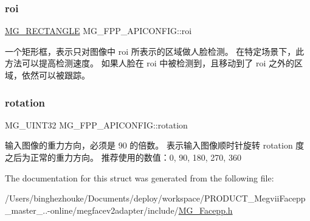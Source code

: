 \subsubsection{\texorpdfstring{roi}{roi}}
{\footnotesize\ttfamily \hyperlink{struct_m_g___r_e_c_t_a_n_g_l_e}{M\+G\+\_\+\+R\+E\+C\+T\+A\+N\+G\+LE} M\+G\+\_\+\+F\+P\+P\+\_\+\+A\+P\+I\+C\+O\+N\+F\+I\+G\+::roi}

一个矩形框，表示只对图像中 roi 所表示的区域做人脸检测。 在特定场景下，此方法可以提高检测速度。 如果人脸在 roi 中被检测到，且移动到了 roi 之外的区域，依然可以被跟踪。 \mbox{\label{struct_m_g___f_p_p___a_p_i_c_o_n_f_i_g_ad0896de3b631a7d8cf84fbfc8015d533}} 
\subsubsection{\texorpdfstring{rotation}{rotation}}
{\footnotesize\ttfamily M\+G\+\_\+\+U\+I\+N\+T32 M\+G\+\_\+\+F\+P\+P\+\_\+\+A\+P\+I\+C\+O\+N\+F\+I\+G\+::rotation}

输入图像的重力方向，必须是 90 的倍数。 表示输入图像顺时针旋转 rotation 度之后为正常的重力方向。 推荐使用的数值：0, 90, 180, 270, 360 

The documentation for this struct was generated from the following file\+:\begin{DoxyCompactItemize}
\item 
/\+Users/binghezhouke/\+Documents/deploy/workspace/\+P\+R\+O\+D\+U\+C\+T\+\_\+\+Megvii\+Facepp\+\_\+master\+\_..-\/online/megfacev2adapter/include/\hyperlink{_m_g___facepp_8h}{M\+G\+\_\+\+Facepp.\+h}\end{DoxyCompactItemize}

